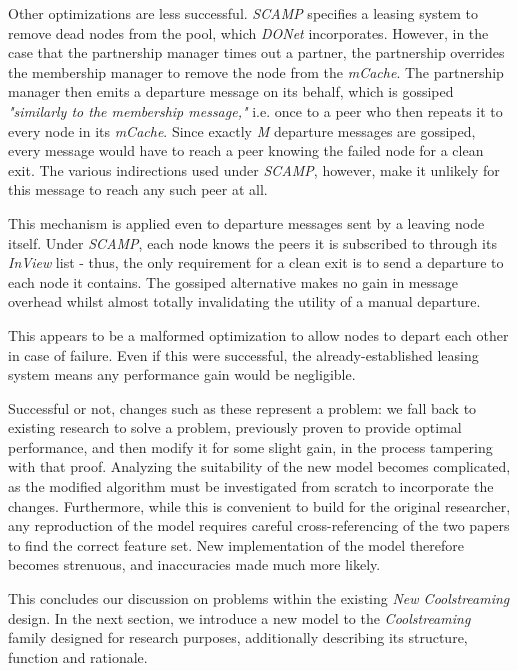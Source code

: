 \documentclass[12pt,a4paper]{article}
\begin{document}
Other optimizations are less successful. \textit{SCAMP} specifies a leasing system to remove dead nodes from the pool, which \textit{DONet} incorporates. However, in the case that the partnership manager times out a partner, the partnership overrides the membership manager to remove the node from the \textit{mCache}. The partnership manager then emits a departure message on its behalf, which is gossiped \textit{"similarly to the membership message,"} i.e. once to a peer who then repeats it to every node in its \textit{mCache}. Since exactly \textit{M} departure messages are gossiped, every message would have to reach a peer knowing the failed node for a clean exit. The various indirections used under \textit{SCAMP}, however, make it unlikely for this message to reach any such peer at all.

This mechanism is applied even to departure messages sent by a leaving node itself. Under  \textit{SCAMP}, each node knows the peers it is subscribed to through its \textit{InView} list - thus, the only requirement for a clean exit is to send a departure to each node it contains. The gossiped alternative makes no gain in message overhead whilst almost totally invalidating the utility of a manual departure.

This appears to be a malformed optimization to allow nodes to depart each other in case of failure. Even if this were successful, the already-established leasing system means any performance gain would be negligible.

Successful or not, changes such as these represent a problem: we fall back to existing research to solve a problem, previously proven to provide optimal performance, and then modify it for some slight gain, in the process tampering with that proof. Analyzing the suitability of the new model becomes complicated, as the modified algorithm must be investigated from scratch to incorporate the changes. Furthermore, while this is convenient to build for the original researcher, any reproduction of the model requires careful cross-referencing of the two papers to find the correct feature set. New implementation of the model therefore becomes strenuous, and inaccuracies made much more likely.

This concludes our discussion on problems within the existing \textit{New Coolstreaming} design. In the next section, we introduce a new model to the \textit{Coolstreaming} family designed for research purposes, additionally describing its structure, function and rationale.
\end{document}
